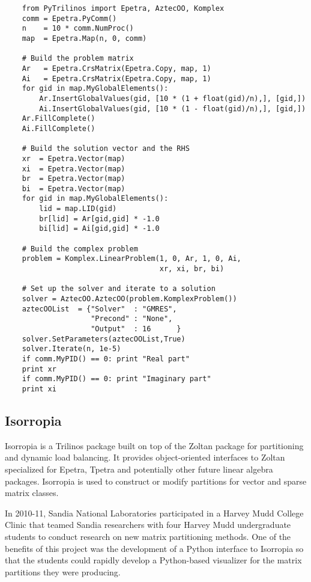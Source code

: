 \documentclass[11pt]{article}
\begin{document}
\begin{verbatim}
    from PyTrilinos import Epetra, AztecOO, Komplex
    comm = Epetra.PyComm()
    n    = 10 * comm.NumProc()
    map  = Epetra.Map(n, 0, comm)
    
    # Build the problem matrix
    Ar   = Epetra.CrsMatrix(Epetra.Copy, map, 1)
    Ai   = Epetra.CrsMatrix(Epetra.Copy, map, 1)
    for gid in map.MyGlobalElements():
        Ar.InsertGlobalValues(gid, [10 * (1 + float(gid)/n),], [gid,])
        Ai.InsertGlobalValues(gid, [10 * (1 - float(gid)/n),], [gid,])
    Ar.FillComplete()
    Ai.FillComplete()

    # Build the solution vector and the RHS
    xr  = Epetra.Vector(map)
    xi  = Epetra.Vector(map)
    br  = Epetra.Vector(map)
    bi  = Epetra.Vector(map)
    for gid in map.MyGlobalElements():
        lid = map.LID(gid)
        br[lid] = Ar[gid,gid] * -1.0
        bi[lid] = Ai[gid,gid] * -1.0

    # Build the complex problem
    problem = Komplex.LinearProblem(1, 0, Ar, 1, 0, Ai,
                                    xr, xi, br, bi)

    # Set up the solver and iterate to a solution
    solver = AztecOO.AztecOO(problem.KomplexProblem())
    aztecOOList  = {"Solver"  : "GMRES",
                    "Precond" : "None",
                    "Output"  : 16      }
    solver.SetParameters(aztecOOList,True)
    solver.Iterate(n, 1e-5)
    if comm.MyPID() == 0: print "Real part"
    print xr
    if comm.MyPID() == 0: print "Imaginary part"
    print xi
\end{verbatim}

\subsection{Isorropia}
\label{sec:isorropia}

Isorropia is a Trilinos package built on top of the Zoltan package for partitioning and dynamic load balancing.  It provides object-oriented interfaces to Zoltan specialized for Epetra, Tpetra and potentially other future linear algebra packages.  Isorropia is used to construct or modify partitions for vector and sparse matrix classes.

In 2010-11, Sandia National Laboratories participated in a Harvey Mudd College Clinic that teamed Sandia researchers with four Harvey Mudd undergraduate students to conduct research on new matrix partitioning methods.  One of the benefits of this project was the development of a Python interface to Isorropia so that the students could rapidly develop a Python-based visualizer for the matrix partitions they were producing.
\end{document}
